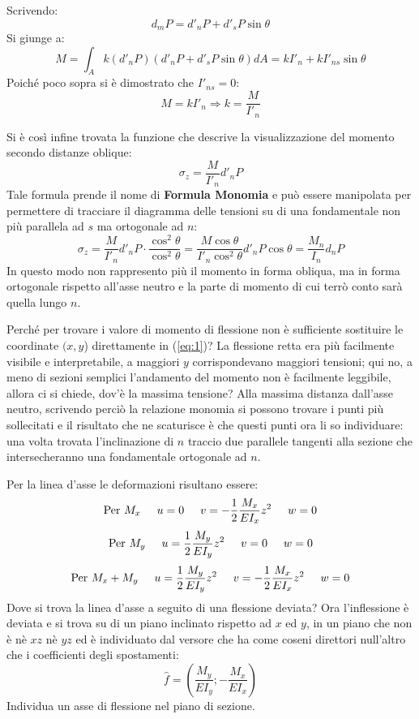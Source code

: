 		Scrivendo:
		\[ d_mP = d'_nP + d'_sP\sin\theta\]
		Si giunge a: 
		\[M = \int_Ak(d'_nP)(d'_nP + d'_sP\sin\theta)dA = kI'_n + kI'_{ns}\sin\theta\]
		Poiché poco sopra si è dimostrato che $I'_{ns}=0$:
		\[M=kI'_n \Rightarrow k =\dfrac{M}{I'_n}\]
		
		Si è così infine trovata la funzione che descrive la visualizzazione del momento secondo distanze oblique:
		\[ \sigma_z = \dfrac{M}{I'_n}d'_nP\]
		Tale formula prende il nome di \textbf{Formula Monomia} e può essere manipolata per permettere di tracciare il diagramma delle tensioni su di una fondamentale non più parallela ad $s$ ma ortogonale ad $n$:
		\[ \sigma_z =\dfrac{M}{I'_n}d'_nP \cdot  \dfrac{\cos^2\theta}{\cos^2\theta}= \dfrac{M\cos\theta}{I'_n\cos^2\theta}d'_nP\cos\theta = \dfrac{M_n}{I_n}d_nP\]
		In questo modo non rappresento più il momento in forma obliqua, ma in forma ortogonale rispetto all'asse neutro e la parte di momento di cui terrò conto sarà quella lungo $n$. \newline 
		
		Perché per trovare i valore di momento di flessione non è sufficiente sostituire le coordinate $(x,y$) direttamente in (\ref{eq:1})? La flessione retta era più facilmente visibile e interpretabile, a maggiori $y$ corrispondevano maggiori tensioni; qui no, a meno di sezioni semplici l'andamento del momento non è facilmente leggibile, allora ci si chiede, dov'è la massima tensione? Alla massima distanza dall'asse neutro, scrivendo perciò la relazione monomia si possono trovare i punti più sollecitati e il risultato che ne scaturisce è che questi punti ora li so individuare: una volta trovata l'inclinazione di $n$ traccio due parallele tangenti alla sezione che intersecheranno una fondamentale ortogonale ad $n$. \newline 
		
		Per la linea d'asse le deformazioni risultano essere: 
		\[ \text{Per} ~ M_x \hspace{0.5cm} u = 0 \hspace{0.5cm} v = -\dfrac{1}{2}\dfrac{M_x}{EI_x}z^2 \hspace{0.5cm} w = 0\]
		\[ \text{Per} ~ M_y \hspace{0.5cm} u = \dfrac{1}{2}\dfrac{M_y}{EI_y}z^2 \hspace{0.5cm} v = 0 \hspace{0.5cm} w = 0\]
		\[ \text{Per} ~ M_x +M_y \hspace{0.5cm} u = \dfrac{1}{2}\dfrac{M_y}{EI_y}z^2 \hspace{0.5cm} v = -\dfrac{1}{2}\dfrac{M_x}{EI_x}z^2 \hspace{0.5cm} w = 0\]
		Dove si trova la linea d'asse a seguito di una flessione deviata? Ora l'inflessione è deviata e si trova su di un piano inclinato rispetto ad $x$ ed $y$, in un piano che non è nè $xz$ nè $yz$ ed è individuato dal versore che ha come coseni direttori null'altro che i coefficienti degli spostamenti:
		\[\hat{f} = \left(\dfrac{M_y}{EI_y}; -\dfrac{M_x}{EI_x}\right)\]
		Individua un asse di flessione nel piano di sezione.
		

